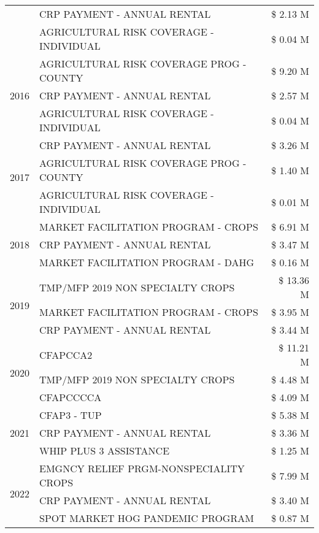 \begin{tabular}{llr}
 & CRP PAYMENT - ANNUAL RENTAL & \$ 2.13 M \\
 & AGRICULTURAL RISK COVERAGE - INDIVIDUAL & \$ 0.04 M \\
\cline{1-3}
\multirow[t]{3}{*}{2016} & AGRICULTURAL RISK COVERAGE PROG - COUNTY & \$ 9.20 M \\
 & CRP PAYMENT - ANNUAL RENTAL & \$ 2.57 M \\
 & AGRICULTURAL RISK COVERAGE - INDIVIDUAL & \$ 0.04 M \\
\cline{1-3}
\multirow[t]{3}{*}{2017} & CRP PAYMENT - ANNUAL RENTAL & \$ 3.26 M \\
 & AGRICULTURAL RISK COVERAGE PROG - COUNTY & \$ 1.40 M \\
 & AGRICULTURAL RISK COVERAGE - INDIVIDUAL & \$ 0.01 M \\
\cline{1-3}
\multirow[t]{3}{*}{2018} & MARKET FACILITATION PROGRAM - CROPS & \$ 6.91 M \\
 & CRP PAYMENT - ANNUAL RENTAL & \$ 3.47 M \\
 & MARKET FACILITATION PROGRAM - DAHG & \$ 0.16 M \\
\cline{1-3}
\multirow[t]{3}{*}{2019} & TMP/MFP 2019 NON SPECIALTY CROPS & \$ 13.36 M \\
 & MARKET FACILITATION PROGRAM - CROPS & \$ 3.95 M \\
 & CRP PAYMENT - ANNUAL RENTAL & \$ 3.44 M \\
\cline{1-3}
\multirow[t]{3}{*}{2020} & CFAPCCA2 & \$ 11.21 M \\
 & TMP/MFP 2019 NON SPECIALTY CROPS & \$ 4.48 M \\
 & CFAPCCCCA & \$ 4.09 M \\
\cline{1-3}
\multirow[t]{3}{*}{2021} & CFAP3 - TUP & \$ 5.38 M \\
 & CRP PAYMENT - ANNUAL RENTAL & \$ 3.36 M \\
 & WHIP PLUS 3 ASSISTANCE & \$ 1.25 M \\
\cline{1-3}
\multirow[t]{3}{*}{2022} & EMGNCY RELIEF PRGM-NONSPECIALITY CROPS & \$ 7.99 M \\
 & CRP PAYMENT - ANNUAL RENTAL & \$ 3.40 M \\
 & SPOT MARKET HOG PANDEMIC PROGRAM & \$ 0.87 M \\
\cline{1-3}
\bottomrule
\end{tabular}
